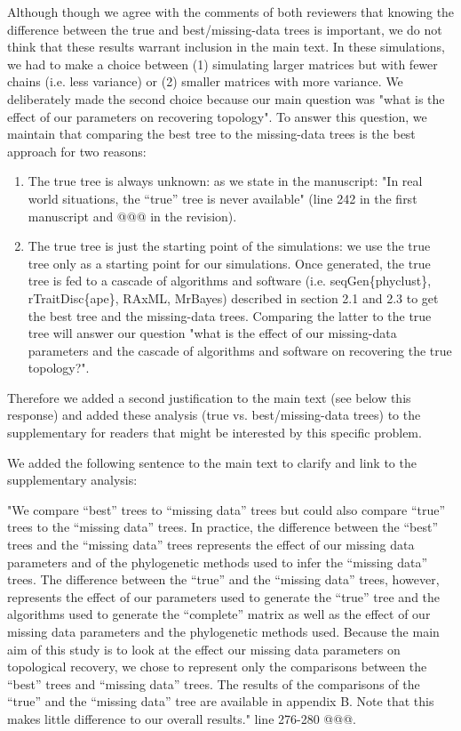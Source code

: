 \documentclass[12pt,letterpaper]{article}
\begin{document}
\begin{enumerate}
Although though we agree with the comments of both reviewers that knowing the difference between the true and best/missing-data trees is important, we do not think that these results warrant inclusion in the main text.
In these simulations, we had to make a choice between (1) simulating larger matrices but with fewer chains (i.e. less variance) or (2) smaller matrices with more variance.
We deliberately made the second choice because our main question was "what is the effect of our parameters on recovering topology".
To answer this question, we maintain that comparing the best tree to the missing-data trees is the best approach for two reasons:
\begin{enumerate}
\item{The true tree is always unknown:} as we state in the manuscript: "In real world situations, the ``true'' tree is never available" (line 242 in the first manuscript and @@@ in the revision).
\item{The true tree is just the starting point of the simulations:} we use the true tree only as a starting point for our simulations.
Once generated, the true tree is fed to a cascade of algorithms and software (i.e. seqGen\{phyclust\}, rTraitDisc\{ape\}, RAxML, MrBayes) described in section 2.1 and 2.3 to get the best tree and the missing-data trees.
Comparing the latter to the true tree will answer our question "what is the effect of our missing-data parameters and the cascade of algorithms and software on recovering the true topology?".
\end{enumerate}
Therefore we added a second justification to the main text (see below this response) and added these analysis (true vs. best/missing-data trees) to the supplementary for readers that might be interested by this specific problem.

We added the following sentence to the main text to clarify and link to the supplementary analysis:

"We compare ``best'' trees to ``missing data'' trees but could also compare ``true'' trees to the ``missing data'' trees.
In practice, the difference between the ``best'' trees and the ``missing data'' trees represents the effect of our missing data parameters and of the phylogenetic methods used to infer the ``missing data'' trees.
The difference between the ``true'' and the ``missing data'' trees, however, represents the effect of our parameters used to generate the ``true'' tree and the algorithms used to generate the ``complete'' matrix as well as the effect of our missing data parameters and the phylogenetic methods used.
Because the main aim of this study is to look at the effect our missing data parameters on topological recovery, we chose to represent only the comparisons between the ``best'' trees and ``missing data'' trees.
The results of the comparisons of the ``true'' and the ``missing data'' tree are available in appendix B.
Note that this makes little difference to our overall results." line 276-280 @@@.


\end{enumerate}
\end{document}

